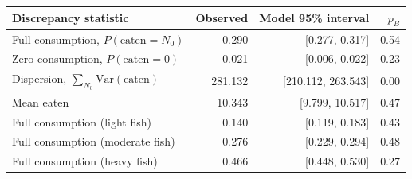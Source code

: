 \begin{tabular}{lrrr}
\toprule
Discrepancy statistic & Observed & Model 95\% interval & $p_B$ \\
\midrule
Full consumption, $P(\text{eaten}=N_0)$ & 0.290 & [0.277, 0.317] & 0.54 \\
Zero consumption, $P(\text{eaten}=0)$ & 0.021 & [0.006, 0.022] & 0.23 \\
Dispersion, $\sum_{N_0}\mathrm{Var}(\text{eaten})$ & 281.132 & [210.112, 263.543] & 0.00 \\
Mean eaten & 10.343 & [9.799, 10.517] & 0.47 \\
Full consumption (light fish) & 0.140 & [0.119, 0.183] & 0.43 \\
Full consumption (moderate fish) & 0.276 & [0.229, 0.294] & 0.48 \\
Full consumption (heavy fish) & 0.466 & [0.448, 0.530] & 0.27 \\
\bottomrule
\end{tabular}
